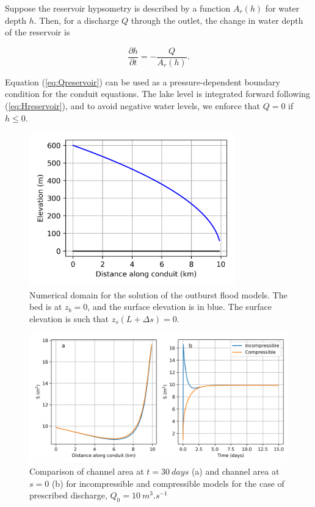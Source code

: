 \documentclass[11pt]{article}
\begin{document}
Suppose the reservoir hypsometry is described by a function $A_r(h)$ for water depth $h$. Then, for a discharge $Q$ through the outlet, the change in water depth of the reservoir is
\begin{linenomath*}
\begin{equation}
\label{eq:Hreservoir}
\frac{\partial h}{\partial t} = -\frac{Q}{A_r(h)}.
\end{equation}
\end{linenomath*}
Equation (\ref{eq:Qreservoir}) can be used as a pressure-dependent boundary condition for the conduit equations. The lake level is integrated forward following (\ref{eq:Hreservoir}), and to avoid negative water levels, we enforce that $Q = 0$ if $h \leq 0$.


\begin{figure}[t]
\centering
\includegraphics[width=3.5in]{domain.png}
\caption{Numerical domain for the solution of the outburst flood models. The bed is at $z_b = 0$, and the surface elevation is in blue. The surface elevation is such that $z_s(L + \Delta s) = 0$.}
\label{fig:domain}
\end{figure}

\begin{figure}[t]
\centering
\includegraphics[width=\textwidth]{imposed_discharge_comparison.png}
\caption{Comparison of channel area at $t = \SI{30}{days}$ (a) and channel area at $s = 0$ (b) for incompressible and compressible models for the case of prescribed discharge, $Q_0 = \SI{10}{m^3.s^{-1}}$}
\label{fig:prescribed}
\end{figure}
\end{document}
